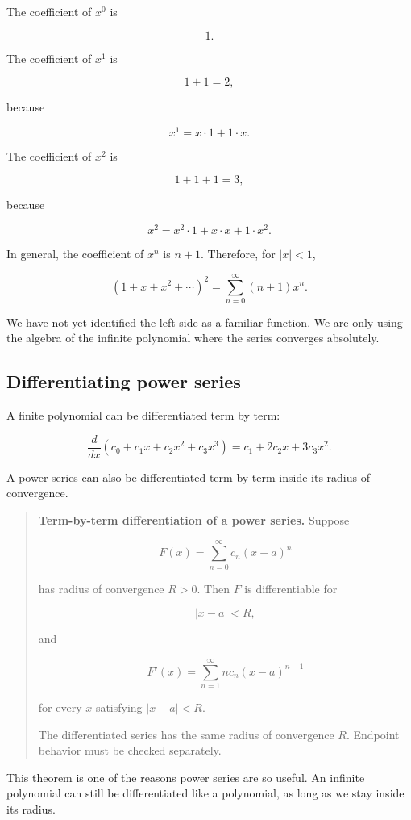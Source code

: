 The coefficient of \(x^0\) is

\[
1.
\]

The coefficient of \(x^1\) is

\[
1+1=2,
\]

because

\[
x^1=x\cdot1+1\cdot x.
\]

The coefficient of \(x^2\) is

\[
1+1+1=3,
\]

because

\[
x^2=x^2\cdot1+x\cdot x+1\cdot x^2.
\]

In general, the coefficient of \(x^n\) is \(n+1\).  Therefore, for \(|x|<1\),

\[
(1+x+x^2+\cdots)^2
=
\sum_{n=0}^{\infty}(n+1)x^n.
\]

We have not yet identified the left side as a familiar function.  We are only using the
algebra of the infinite polynomial where the series converges absolutely.

\subsection{Differentiating power series}
\label{subsec:differentiating-power-series}

A finite polynomial can be differentiated term by term:

\[
\frac{d}{dx}\left(c_0+c_1x+c_2x^2+c_3x^3\right)
=
c_1+2c_2x+3c_3x^2.
\]

A power series can also be differentiated term by term inside its radius of convergence.

\begin{quote}
\textbf{Term-by-term differentiation of a power series.}
Suppose

\[
F(x)=\sum_{n=0}^{\infty} c_n(x-a)^n
\]

has radius of convergence \(R>0\).  Then \(F\) is differentiable for

\[
|x-a|<R,
\]

and

\[
\boxed{
F'(x)=\sum_{n=1}^{\infty} n c_n(x-a)^{n-1}
}
\]

for every \(x\) satisfying \(|x-a|<R\).

The differentiated series has the same radius of convergence \(R\).  Endpoint behavior
must be checked separately.
\end{quote}

This theorem is one of the reasons power series are so useful.  An infinite polynomial
can still be differentiated like a polynomial, as long as we stay inside its radius.

